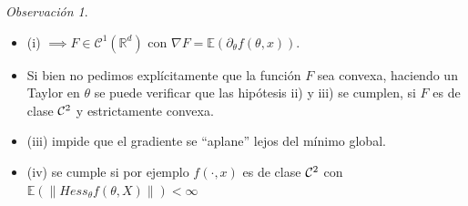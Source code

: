 \documentclass[letterpaper,11pt]{article} %
\theoremstyle{defbreak}
\theoremstyle{propbreak}
\theoremstyle{remark}
\newtheorem{remark}{Observación}[subsection]
\theoremstyle{break}
\def\R{\mathbb{R}}
\def\E{\mathbb{E}}
\def\beforeitemize{\leavevmode \vspace{-0.5\baselineskip}}
\begin{document}
\begin{remark}
\beforeitemize
\begin{itemize}
\item (i) $\implies F\in\mathcal{C}^1(\R^d)$ con  $\nabla F=\E(\partial_\theta f(\theta,x))$. 
     \item Si bien no pedimos explícitamente que la función $F$ sea  convexa, haciendo un Taylor en $\theta$ se puede verificar que las hipótesis ii) y iii) se cumplen, si  $F$ es  de clase ${\cal C}^2$ y estrictamente convexa. 
     \item (iii)  impide que el gradiente se ``aplane'' lejos del m\'inimo global. 
    \item (iv) se cumple si por ejemplo $f(\cdot,x)$ es  de clase ${\cal C}^2$ con  $\E(\|Hess_\theta f(\theta,X)\|)<\infty$ %
\end{itemize}
\end{remark}
\end{document}
